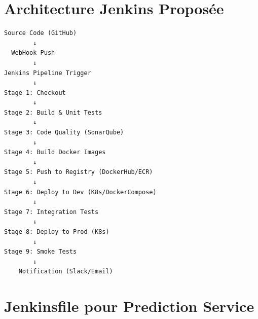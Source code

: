 \documentclass[12pt,a4paper,twoside]{report}
\begin{document}
\section{Architecture Jenkins Proposée}

\begin{verbatim}
Source Code (GitHub)
        ↓
  WebHook Push
        ↓
Jenkins Pipeline Trigger
        ↓
Stage 1: Checkout
        ↓
Stage 2: Build & Unit Tests
        ↓
Stage 3: Code Quality (SonarQube)
        ↓
Stage 4: Build Docker Images
        ↓
Stage 5: Push to Registry (DockerHub/ECR)
        ↓
Stage 6: Deploy to Dev (K8s/DockerCompose)
        ↓
Stage 7: Integration Tests
        ↓
Stage 8: Deploy to Prod (K8s)
        ↓
Stage 9: Smoke Tests
        ↓
    Notification (Slack/Email)
\end{verbatim}

\section{Jenkinsfile pour Prediction Service}
\end{document}

